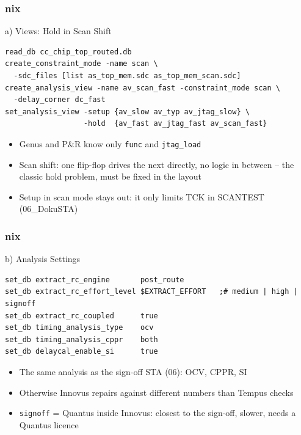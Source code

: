 \documentclass{beamer}
\newcommand{\astitle}{nix}
\newcommand{\assubtitle}{nix}
\newcommand{\cmd}[1]{\texttt{#1}}
\begin{document}
\renewcommand{\assubtitle}{a) Views: Hold in Scan Shift}
\begin{frame}[fragile]
\frametitle{\astitle}
\begin{block}{\assubtitle}
\begin{lstlisting}[style=sh]
read_db cc_chip_top_routed.db
create_constraint_mode -name scan \
  -sdc_files [list as_top_mem.sdc as_top_mem_scan.sdc]
create_analysis_view -name av_scan_fast -constraint_mode scan \
  -delay_corner dc_fast
set_analysis_view -setup {av_slow av_typ av_jtag_slow} \
                  -hold  {av_fast av_jtag_fast av_scan_fast}
\end{lstlisting}
  \begin{itemize}
    \item Genus and P\&R know only \cmd{func} and \cmd{jtag\_load}
    \item Scan shift: one flip-flop drives the next directly, no logic in
      between -- the classic hold problem, must be fixed in the layout
    \item Setup in scan mode stays out: it only limits TCK in SCANTEST
      (06\_DokuSTA)
  \end{itemize}
\end{block}
\end{frame}

\renewcommand{\assubtitle}{b) Analysis Settings}
\begin{frame}[fragile]
\frametitle{\astitle}
\begin{block}{\assubtitle}
\begin{lstlisting}[style=sh]
set_db extract_rc_engine       post_route
set_db extract_rc_effort_level $EXTRACT_EFFORT   ;# medium | high | signoff
set_db extract_rc_coupled      true
set_db timing_analysis_type    ocv
set_db timing_analysis_cppr    both
set_db delaycal_enable_si      true
\end{lstlisting}
  \begin{itemize}
    \item The same analysis as the sign-off STA (06): OCV, CPPR, SI
    \item Otherwise Innovus repairs against different numbers than
      Tempus checks
    \item \cmd{signoff} = Quantus inside Innovus: closest to the sign-off,
      slower, needs a Quantus licence
  \end{itemize}
\end{block}
\end{frame}
\end{document}
